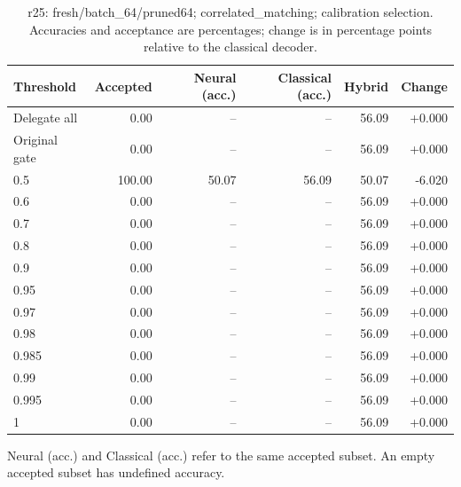 \begin{table}[htbp]
\centering\small
\setlength{\tabcolsep}{3pt}
\caption{r25: fresh/batch\_64/pruned64; correlated\_matching; calibration selection. Accuracies and acceptance are percentages; change is in percentage points relative to the classical decoder.}
\begin{tabular}{lrrrrr}
\toprule
Threshold & Accepted & Neural (acc.) & Classical (acc.) & Hybrid & Change \\
\midrule
Delegate all & 0.00 & -- & -- & 56.09 & +0.000 \\
Original gate & 0.00 & -- & -- & 56.09 & +0.000 \\
0.5 & 100.00 & 50.07 & 56.09 & 50.07 & -6.020 \\
0.6 & 0.00 & -- & -- & 56.09 & +0.000 \\
0.7 & 0.00 & -- & -- & 56.09 & +0.000 \\
0.8 & 0.00 & -- & -- & 56.09 & +0.000 \\
0.9 & 0.00 & -- & -- & 56.09 & +0.000 \\
0.95 & 0.00 & -- & -- & 56.09 & +0.000 \\
0.97 & 0.00 & -- & -- & 56.09 & +0.000 \\
0.98 & 0.00 & -- & -- & 56.09 & +0.000 \\
0.985 & 0.00 & -- & -- & 56.09 & +0.000 \\
0.99 & 0.00 & -- & -- & 56.09 & +0.000 \\
0.995 & 0.00 & -- & -- & 56.09 & +0.000 \\
1 & 0.00 & -- & -- & 56.09 & +0.000 \\
\bottomrule
\end{tabular}
\par\smallskip\footnotesize Neural (acc.) and Classical (acc.) refer to the same accepted subset. An empty accepted subset has undefined accuracy.
\end{table}
